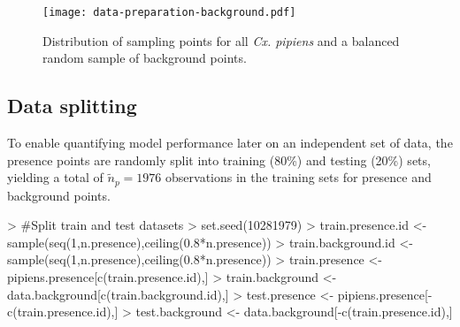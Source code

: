 \documentclass[10pt]{article}
\renewenvironment{Schunk}{\vspace{\topsep}}{\vspace{\topsep}}
\begin{document}
\begin{Schunk}
\end{Schunk}

\begin{figure}
  \begin{center}
    \texttt{[image: data-preparation-background.pdf]}
    \caption{Distribution of sampling points for all \emph{Cx. pipiens} and a balanced random sample of background points.}  
    \label{fig:presence-background}
  \end{center}
\end{figure}

\subsection{Data splitting}

To enable quantifying model performance later on an independent set of data, the presence points are randomly split into training (80\%) and testing (20\%) sets, yielding a total of $\tilde n_p = 1976$ observations in the training sets for presence and background points.


\begin{Schunk}
\begin{Sinput}
> #Split train and test datasets
> set.seed(10281979)
> train.presence.id <- sample(seq(1,n.presence),ceiling(0.8*n.presence))
> train.background.id <- sample(seq(1,n.presence),ceiling(0.8*n.presence))
> train.presence <- pipiens.presence[c(train.presence.id),]
> train.background <- data.background[c(train.background.id),]
> test.presence <- pipiens.presence[-c(train.presence.id),]
> test.background <- data.background[-c(train.presence.id),]
\end{Sinput}
\end{Schunk}
\end{document}
